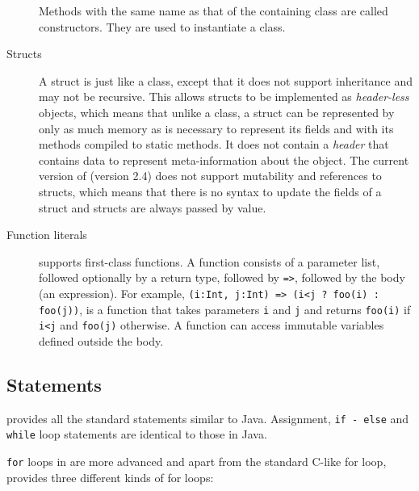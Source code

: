 \begin{description}
Methods with the same name as that of the containing class are called
constructors. They are used to instantiate a class. 

\item[Structs] A struct is just like a class, except that it does not support
inheritance and may not be recursive. This allows structs to be implemented as
\emph{header-less} objects, which means that unlike a class, a struct can be
represented by only as much memory as is necessary to represent its fields and
with its methods compiled to static methods. It does not contain a \emph{header}
that contains data to represent meta-information about the object. The current version
of \xten (version 2.4) does not support mutability and references to structs,
which means that there is no syntax to update the fields of a struct and structs
are always passed by value. 


\item[Function literals] \xten supports first-class functions. A
function consists of a parameter list, followed optionally by a return type,
followed by \texttt{=>}, followed by the body (an expression). For example,
\texttt{(i:Int, j:Int) => (i<j ? foo(i) : foo(j))}, is a function that takes
parameters \texttt{i} and \texttt{j} and returns \texttt{foo(i)} if \texttt{i<j}
and \texttt{foo(j)} otherwise. A function can access immutable variables defined
outside the body.  
 
\end{description}

\subsection{Statements} \xten provides all the standard statements similar to
Java. Assignment, \texttt{if - else} and \texttt{while} loop statements are 
identical to those in Java.

\texttt{for} loops in \xten are more advanced and  apart 
from the standard C-like for loop, \xten
provides three different kinds of for loops:

